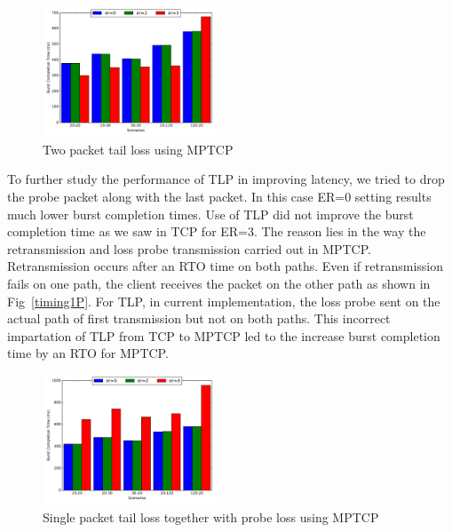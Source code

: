\documentclass[10pt,draftcls,twocolumn]{IEEEconf}
\begin{document}
\begin{figure}[!ht]
\begin{center}
\includegraphics[angle=0, width=0.46\textwidth,natwidth=578.16,natheight=433.62]{plots/2P.pdf}
\caption{Two packet tail loss using MPTCP}\label{2p}
\end{center}
\end{figure}

To further study the performance of TLP in improving latency, we tried to drop the probe packet along with the last packet. In this case ER=0
setting results much lower burst completion times. Use of TLP did not improve the burst completion time as we saw in TCP for ER=3. The reason
lies in the way the retransmission and loss probe transmission carried out in MPTCP. Retransmission occurs after an RTO time on both paths.
Even if retransmission fails on one path, the client receives the packet on the other path as shown in Fig~\ref{timing1P}. For TLP, in
current implementation, the loss probe sent on the actual path of first transmission but not on both paths. This incorrect impartation of
TLP from TCP to MPTCP led to the increase burst completion time by an RTO for MPTCP. 


\begin{figure}[!ht]
\begin{center}
\includegraphics[angle=0, width=0.46\textwidth, natwidth=578.16,natheight=433.62]{plots/1PP.pdf}
\caption{Single packet tail loss together with probe loss using MPTCP}\label{1pp}
\end{center}
\end{figure}
\end{document}
